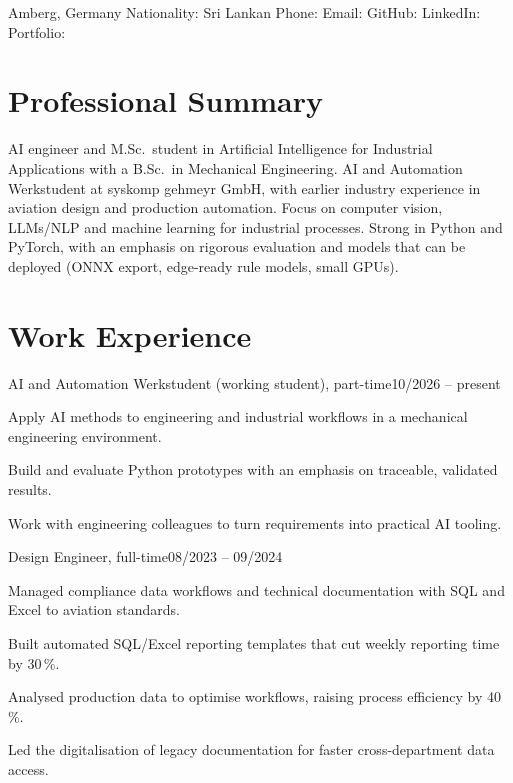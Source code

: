 \documentclass[a4paper,10pt]{article}
\begin{document}
\cvheader
  {Amberg, Germany \cvsep Nationality: Sri Lankan \cvsep Phone: \mbox{\cvphone}}
  {Email: \mbox{\href{mailto:\cvemail}{\cvemail}} \cvsep GitHub: \mbox{\href{https://\cvgithub}{\cvgithub}}}
  {LinkedIn: \mbox{\href{https://www.\cvlinkedin}{\cvlinkedin}}}
  {Portfolio: \mbox{\href{https://\cvportfolio/}{\cvportfolio}}}

\section{Professional Summary}
{\small
AI engineer and M.Sc.\ student in Artificial Intelligence for Industrial Applications with a B.Sc.\ in Mechanical
Engineering. AI and Automation Werkstudent at syskomp gehmeyr GmbH, with earlier industry experience in aviation
design and production automation. Focus on computer vision, LLMs/NLP and machine learning for industrial processes.
Strong in Python and PyTorch, with an emphasis on rigorous evaluation and models that can be deployed (ONNX export,
edge-ready rule models, small GPUs).
}

\section{Work Experience}
\cvliststart

          {AI and Automation Werkstudent (working student), part-time}{10/2026 -- present}
  \cvpointsstart
    \item Apply AI methods to engineering and industrial workflows in a mechanical engineering environment.
    \item Build and evaluate Python prototypes with an emphasis on traceable, validated results.
    \item Work with engineering colleagues to turn requirements into practical AI tooling.
  \cvpointsend

          {Design Engineer, full-time}{08/2023 -- 09/2024}
  \cvpointsstart
    \item Managed compliance data workflows and technical documentation with SQL and Excel to aviation standards.
    \item Built automated SQL/Excel reporting templates that cut weekly reporting time by 30\,\%.
    \item Analysed production data to optimise workflows, raising process efficiency by 40\,\%.
    \item Led the digitalisation of legacy documentation for faster cross-department data access.
  \cvpointsend
\end{document}
